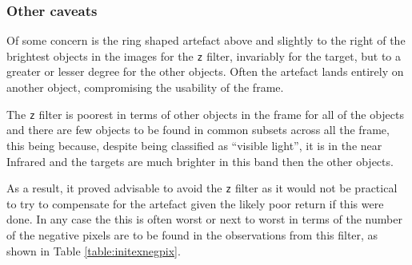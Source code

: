 \subsubsection{Other caveats}
\protect\label{section:otherissues}

Of some concern is the ring shaped artefact above and slightly to the right of
the brightest objects in the images for the \texttt{z} filter, invariably for
the target, but to a greater or lesser degree for the other objects. Often the
artefact lands entirely on another object, compromising the usability of the
frame.

The \texttt{z} filter is poorest in terms of other objects in the frame for all
of the objects and there are few objects to be found in common subsets across
all the frame, this being because, despite being classified as ``visible
light'', it is in the near Infrared and the {\rdwarf} targets are much brighter
in this band then the other objects.

As a result, it proved advisable to avoid the \texttt{z} filter as it would not
be practical to try to compensate for the artefact given the likely poor return
if this were done. In any case the this is often worst or next to worst in terms
of the number of the negative pixels are to be found in the observations from
this filter, as shown in Table \ref{table:initexnegpix}.

\clearpage
